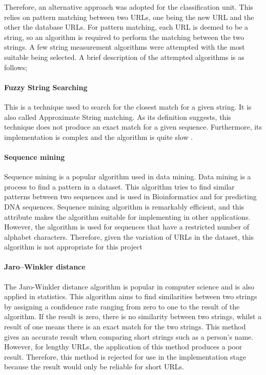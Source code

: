 Therefore, an alternative approach was adopted for the classification unit. This relies on pattern matching between two URLs, one being the new URL and the other the database URLs. For pattern matching, each URL is deemed to be a string, so an algorithm is required to perform the matching between the two strings. A few string measurement algorithms were attempted with the most suitable being selected. A brief description of the attempted algorithms is as follows;

\paragraph{Fuzzy String Searching}
			
This is a technique used to search for the closest match for a given string. It is also called Approximate String matching. As its definition suggests, this technique does not produce an exact match for a given sequence. Furthermore, its implementation is complex and the algorithm is quite slow \cite{String-match}.

\paragraph{Sequence mining}

Sequence mining is a popular algorithm used in data mining. Data mining is a process to find a pattern in a dataset. This algorithm tries to find similar patterns between two sequences and is used in Bioinformatics and for predicting DNA sequences. Sequence mining algorithm is remarkably efficient, and this attribute makes the algorithm suitable for implementing in other applications. However, the algorithm is used for sequences that have a restricted number of alphabet characters. Therefore, given the variation of URLs in the dataset, this algorithm is not appropriate for this project\cite{Sequence-mining}  

\paragraph{Jaro–Winkler distance}

The Jaro-Winkler distance algorithm is popular in computer science and is also applied in statistics. This algorithm aims to find similarities between two strings by assigning a confidence rate ranging from zero to one to the result of the algorithm. If the result is zero, there is no similarity between two strings, whilst a result of one means there is an exact match for the two strings. This method gives an accurate result when comparing short strings such as a person’s name. However, for lengthy URLs, the application of this method produces a poor result. Therefore, this method is rejected for use in the implementation stage because the result would only be reliable for short URLs\cite{Jargo-winkle}. 

